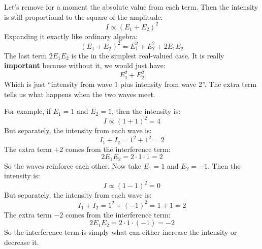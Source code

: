 \highspace
\begin{deepeningbox}
    Let's remove for a moment the absolute value from each term. Then the intensity is still proportional to the square of the amplitude:
    \begin{equation*}
        I \propto \left(E_1 + E_2\right)^{2}
    \end{equation*}
    Expanding it exactly like ordinary algebra:
    \begin{equation*}
        \left(E_1 + E_2\right)^{2} = E_1^{2} + E_2^{2} + 2 E_1 E_2
    \end{equation*}
    The last term $2 E_1 E_2$ is the  in the simplest real-valued case. It is really \textbf{important} because without it, we would just have:
    \begin{equation*}
        E_1^{2} + E_2^{2}
    \end{equation*}
    Which is just ``intensity from wave 1 plus intensity from wave 2''. The extra term tells us what happens when the two waves meet.

    \highspace
    For example, if $E_1 = 1$ and $E_2 = 1$, then the intensity is:
    \begin{equation*}
        I \propto \left(1 + 1\right)^{2} = 4
    \end{equation*}
    But separately, the intensity from each wave is:
    \begin{equation*}
        I_1 + I_2 = 1^{2} + 1^{2} = 2
    \end{equation*}
    The extra term $+2$ comes from the interference term:
    \begin{equation*}
        2 E_1 E_2 = 2 \cdot 1 \cdot 1 = 2
    \end{equation*}
    So the waves reinforce each other. Now take $E_1 = 1$ and $E_2 = -1$. Then the intensity is:
    \begin{equation*}
        I \propto \left(1 - 1\right)^{2} = 0
    \end{equation*}
    But separately, the intensity from each wave is:
    \begin{equation*}
        I_1 + I_2 = 1^{2} + (-1)^{2} = 1 + 1 = 2
    \end{equation*}
    The extra term $-2$ comes from the interference term:
    \begin{equation*}
        2 E_1 E_2 = 2 \cdot 1 \cdot (-1) = -2
    \end{equation*}
    So the interference term is simply what can either increase the intensity or decrease it.


\end{deepeningbox}
